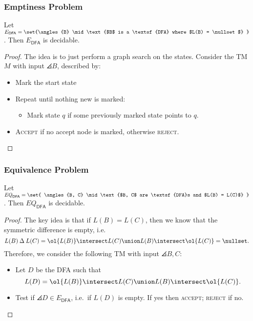 \documentclass{standalone}
\begin{document}
\subsubsection{Emptiness Problem}
\begin{proposition}
	Let \(E_{\textsf{DFA}} = \set{\angles{B} \mid
		\text{$B$ is a \textsf{DFA} where $L(B) = \nullset$}
	}\). Then \(E_{\textsf{DFA}}\) is decidable.
\end{proposition}
\begin{proof}
	The idea is to just perform a graph search on the states.
  Consider the \textsf{TM} \(M\) with input \(\angles B\), described by:
	\begin{itemize}
		\item Mark the start state
		\item Repeat until nothing new is marked:
		\begin{itemize}[nosep]
			\item Mark state \(q\) if some previously marked state points to \(q\).
		\end{itemize}
		\item \textsc{Accept} if no accept node is marked,
          otherwise \textsc{reject}. \qedhere
	\end{itemize}
\end{proof}

\subsubsection{Equivalence Problem}
\begin{proposition}
	Let \(\mathit{EQ}_{\textsf{DFA}} = \set{
		\angles{B, C} \mid \text{$B, C$ are \textsf{DFA}s and $L(B) = L(C)$}
	}\). Then \(EQ_{\textsf{DFA}}\) is decidable.
\end{proposition}
\begin{proof}
	The key idea is that if \(L(B) = L(C)\),
  then we know that the symmetric difference is empty, i.e.
	\[
		L(B) \mathbin{\Delta} L(C)
      = \ol{L(B)} \intersect L(C) \union L(B) \intersect \ol{L(C)}
      = \nullset.
	\]
	Therefore, we consider the following \textsf{TM}
  with input \(\angles{B, C}\):
	\begin{itemize}
		\item Let \(D\) be the \textsf{DFA} such that
		\[
			L(D) = \ol{L(B)} \intersect L(C) \union L(B) \intersect \ol{L(C)}.
		\]
		\item Test if \(\angles{D} \in E_{\textsf{DFA}}\),
          i.e.\ if \(L(D)\) is empty.
          If yes then \textsc{accept}; \textsc{reject} if no. \qedhere
	\end{itemize}
\end{proof}
\end{document}
